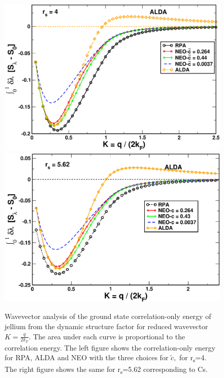 \documentclass[aps,amsmath,amssymb, preprint, 12pt]{revtex4-1}
\begin{document}

\begin{figure}[h!]	
	
	\includegraphics[scale=0.3]{figure_8a.pdf}
	\includegraphics[scale=0.3]{figure_8b.pdf}
	\caption{Wavevector analysis of the ground state correlation-only energy of jellium from the dynamic structure factor for reduced wavevector  \( K=\frac{q}{2k_{F}}. \) The area under each curve is proportional to the correlation energy. The left figure shows the correlation-only energy for RPA, ALDA and NEO with the three choices for  \( \widetilde{c}, \)  for r\textsubscript{s}=4. The right figure shows the same for r\textsubscript{s}=5.62 corresponding to Cs.}
	\label{fig7}
\end{figure}


\end{document}
